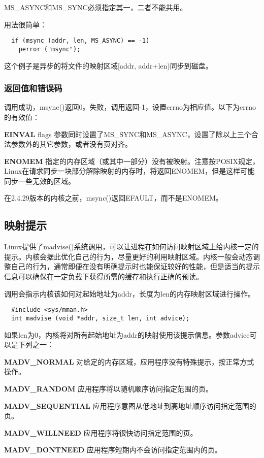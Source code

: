 MS\_ASYNC和MS\_SYNC必须指定其一，二者不能共用。

用法很简单：

\begin{lstlisting}
  if (msync (addr, len, MS_ASYNC) == -1)
    perror ("msync");
\end{lstlisting}

这个例子是异步的将文件的映射区域[addr, addr+len)同步到磁盘。

\subsubsection{返回值和错误码}

调用成功，msync()返回0。失败，调用返回-1，设置errno为相应值。以下为errno的有效值：

\begin{eqlist*}
\item[\textbf{EINVAL}] flags 参数同时设置了MS\_SYNC和MS\_ASYNC，设置了除以上三个合法参数外的其它参数，或者没有页对齐。
\item[\textbf{ENOMEM}] 指定的内存区域（或其中一部分）没有被映射。注意按POSIX规定，Linux在请求同步一块部分解除映射的内存时，将返回ENOMEM，但是这样可能同步一些无效的区域。
\end{eqlist*}

在2.4.29版本的内核之前，msync()返回EFAULT，而不是ENOMEM。

\subsection{映射提示}

Linux提供了madvise()系统调用，可以让进程在如何访问映射区域上给内核一定的提示。内核会据此优化自己的行为，尽量更好的利用映射区域。内核一般会动态调整自己的行为，通常即便在没有明确提示时也能保证较好的性能，但是适当的提示信息可以确保在一定负载下获得所需的缓存和执行正确的预读。

调用会指示内核该如何对起始地址为addr，长度为len的内存映射区域进行操作。

\begin{lstlisting}
  #include <sys/mman.h>
  int madvise (void *addr, size_t len, int advice);
\end{lstlisting}

如果len为0，内核将对所有起始地址为addr的映射使用该提示信息。参数advice可以是下列之一：

\begin{eqlist*}
\item[\textbf{MADV\_NORMAL}] 对给定的内存区域，应用程序没有特殊提示，按正常方式操作。
\item[\textbf{MADV\_RANDOM}] 应用程序将以随机顺序访问指定范围的页。
\item[\textbf{MADV\_SEQUENTIAL}] 应用程序意图从低地址到高地址顺序访问指定范围的页。
\item[\textbf{MADV\_WILLNEED}] 应用程序将很快访问指定范围的页。
\item[\textbf{MADV\_DONTNEED}] 应用程序短期内不会访问指定范围内的页。
\end{eqlist*}


